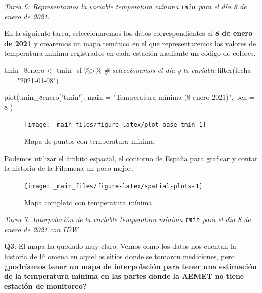 \documentclass[
]{report}
\newenvironment{Shaded}{\begin{snugshade}}{\end{snugshade}}
\newcommand{\AttributeTok}[1]{\textcolor[rgb]{0.77,0.63,0.00}{#1}}
\newcommand{\CommentTok}[1]{\textcolor[rgb]{0.56,0.35,0.01}{\textit{#1}}}
\newcommand{\DecValTok}[1]{\textcolor[rgb]{0.00,0.00,0.81}{#1}}
\newcommand{\FunctionTok}[1]{\textcolor[rgb]{0.00,0.00,0.00}{#1}}
\newcommand{\NormalTok}[1]{#1}
\newcommand{\OtherTok}[1]{\textcolor[rgb]{0.56,0.35,0.01}{#1}}
\newcommand{\SpecialCharTok}[1]{\textcolor[rgb]{0.00,0.00,0.00}{#1}}
\newcommand{\StringTok}[1]{\textcolor[rgb]{0.31,0.60,0.02}{#1}}
\theoremstyle{definition}
\theoremstyle{definition}
\theoremstyle{definition}
\theoremstyle{definition}
\theoremstyle{remark}
\begin{document}
\emph{Tarea 6: Representamos la variable temperatura mínima \texttt{tmin} para el día 8 de
enero de 2021.}

En la siguiente tarea, seleccionaremos los datos correspondientes al \textbf{8 de
enero de 2021} y crearemos un mapa temático en el que representaremos los
valores de temperatura mínima registrados en cada estación mediante un código de
colores.

\begin{Shaded}
\begin{Highlighting}[]
\NormalTok{tmin\_8enero }\OtherTok{\textless{}{-}}\NormalTok{ tmin\_sf }\SpecialCharTok{\%\textgreater{}\%}
  \CommentTok{\# seleccionamos el día y la variable}
  \FunctionTok{filter}\NormalTok{(fecha }\SpecialCharTok{==} \StringTok{"2021{-}01{-}08"}\NormalTok{)}


\FunctionTok{plot}\NormalTok{(tmin\_8enero[}\StringTok{"tmin"}\NormalTok{],}
  \AttributeTok{main =} \StringTok{"Temperatura mínima (8{-}enero{-}2021)"}\NormalTok{,}
  \AttributeTok{pch =} \DecValTok{8}
\NormalTok{)}
\end{Highlighting}
\end{Shaded}

\begin{figure}

{\centering \texttt{[image: \_main\_files/figure-latex/plot-base-tmin-1]} 

}

\caption{Mapa de puntos con temperatura mínima}\label{fig:plot-base-tmin}
\end{figure}

Podemos utilizar el ámbito espacial, el contorno de España para graficar y
contar la historia de la Filomena un poco mejor.

\begin{figure}

{\centering \texttt{[image: \_main\_files/figure-latex/spatial-plots-1]} 

}

\caption{Mapa completo con temperatura mínima}\label{fig:spatial-plots}
\end{figure}

\emph{Tarea 7: Interpolación de la variable temperatura mínima \texttt{tmin} para el día 8
de enero de 2021 con IDW}

\textbf{Q3}: El mapa ha quedado muy claro. Vemos como los datos nos cuentan la
historia de Filomena en aquellos sitios donde se tomaron mediciones, pero
\textbf{¿podríamos tener un mapa de interpolación para tener una estimación de la
temperatura mínima en las partes donde la AEMET no tiene estación de
monitoreo?}
\end{document}
